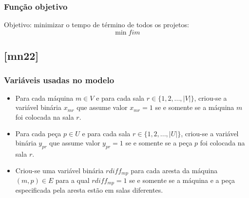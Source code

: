 \documentclass[11pt,letterpaper]{article}
\begin{document}
\subsubsection*{Função objetivo}
Objetivo: minimizar o tempo de término de todos os projetos:
\begin{equation}
  \min fim
\end{equation}


\subsection{{[}mn22{]}}
\subsubsection*{Variáveis usadas no modelo}
\begin{itemize}
\item Para cada máquina $m \in V$ e para cada sala $r \in
  \{1,2,...,|V|\}$, criou-se a variável binária $x_{mr}$ que assume valor
  $x_{mr}=1$ se e somente se  a máquina $m$
  foi colocada na sala $r$.


\item Para cada peça $p \in U$ e para cada sala $r \in
  \{1,2,...,|U|\}$, criou-se a variável binária $y_{pr}$ que assume valor
  $y_{pr}=1$ se e somente se a peça $p$  foi colocada na sala $r$.

\item Criou-se uma variável binária $rdiff_{mp}$ para
  cada aresta da máquina $(m,p) \in  E$ para a qual
  $rdiff_{mp}=1$ se e somente se a máquina e a peça especificada pela aresta estão em salas diferentes.

\end{itemize}
\end{document}
